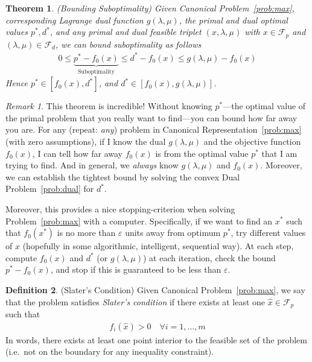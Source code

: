 \documentclass[12pt]{article}
\numberwithin{equation}{section} %
\theoremstyle{plain}
\newtheorem{thm}{Theorem}[section]
\theoremstyle{definition}
\newtheorem{defn}[thm]{Definition}
\theoremstyle{remark}
\newtheorem*{rmk}{Remark}
\begin{document}
\begin{thm}{\emph{(Bounding Suboptimality)}}
Given Canonical Problem~\ref{prob:max}, corresponding Lagrange dual
function $g(\lambda,\mu)$, the primal and dual optimal values $p^*,
d^*$, and any primal and dual feasible triplet $(x,\lambda,\mu)$ with
$x\in\mathscr{F}_p$ and $(\lambda,\mu)\in\mathscr{F}_d$, we can bound
suboptimality as follows
\begin{align*}
  0 \leq \underbrace{p^* - f_0(x)}_{\text{Suboptimality}}
  \leq d^* - f_0(x)
  \leq g(\lambda,\mu) - f_0(x)
\end{align*}
Hence $p^*\in [f_0(x), d^*]$, and $d^*\in[f_0(x),g(\lambda,\mu)]$.
\end{thm}
\begin{rmk}
This theorem is incredible! Without knowing $p^*$---the optimal value of
the primal problem that you really want to find---you can bound how far
away you are. For any (repeat: \emph{any}) problem in Canonical
Representation~\ref{prob:max} (with zero assumptions), if I know the
dual $g(\lambda,\mu)$ and the objective function $f_0(x)$, I can tell
how far away $f_0(x)$ is from the optimal value $p^*$ that I am trying
to find. And in general, we \emph{always} know $g(\lambda,\mu)$ and
$f_0(x)$. Moreover, we can establish the tightest bound by solving the
convex Dual Problem~\ref{prob:dual} for $d^*$.

Moreover, this provides a nice stopping-criterion when solving
Problem~\ref{prob:max} with a computer. Specifically, if we want to find
an $x^*$ such that $f_0(x^*)$ is
no more than $\varepsilon$ units away from  optimum $p^*$, try different
values of $x$ (hopefully in some algorithmic, intelligent, sequential
way). At each step, compute $f_0(x)$ and $d^*$ (or $g(\lambda,\mu)$) at
each iteration, check the bound $p^*-f_0(x)$, and stop if this is
guaranteed to be less than $\varepsilon$.
\end{rmk}

\begin{defn}{(Slater's Condition)}
Given Canonical Problem~\ref{prob:max}, we say that the problem
satisfies \emph{Slater's condition} if there exists at least one
$\hat{x}\in\mathscr{F}_p$ such that
\begin{align*}
  f_i(\hat{x})>0
  \quad \forall i=1,\ldots,m
\end{align*}
In words, there exists at least one point interior to the feasible set
of the problem (i.e.\ not on the boundary for any inequality
constraint).
\end{defn}
\end{document}
